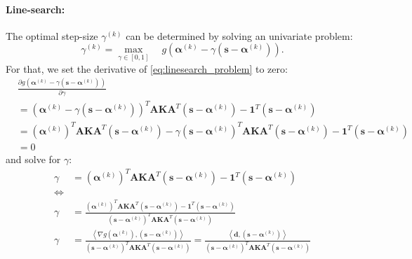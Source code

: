 \documentclass{article}
\newcommand{\balpha}{\boldsymbol{\alpha}}
\newcommand{\bones}{\mathbf{1}}
\begin{document}
\paragraph{Line-search:}
The optimal step-size $\gamma^{(k)}$ can be determined by solving an univariate problem:
\begin{equation}
    \gamma^{(k)}=\underset{\gamma\in[0,1]}{\max}\quad g\left(\balpha^{(k)}-\gamma\left(\mathbf{s}-\balpha^{(k)}\right)\right).
    \label{eq:linesearch_problem}
\end{equation}
For that, we set the derivative of \eqref{eq:linesearch_problem} to zero: 
\begin{align}
    &\frac{\partial g\left(\balpha^{(k)}-\gamma\left(\mathbf{s}-\balpha^{(k)}\right)\right)}{\partial\gamma}\\
        &=\left(\balpha^{(k)}-\gamma\left(\mathbf{s}-\balpha^{(k)}\right)\right)^T\mathbf{A}\mathbf{K}\mathbf{A}^T\left(\mathbf{s}-\balpha^{(k)}\right)-\bones^T\left(\mathbf{s}-\balpha^{(k)}\right)\\
        &=\left(\balpha^{(k)}\right)^T\mathbf{A}\mathbf{K}\mathbf{A}^T\left(\mathbf{s}-\balpha^{(k)}\right)
            -\gamma\left(\mathbf{s}-\balpha^{(k)}\right)^T\mathbf{A}\mathbf{K}\mathbf{A}^T\left(\mathbf{s}-\balpha^{(k)}\right)
            -\bones^T\left(\mathbf{s}-\balpha^{(k)}\right)\\
        &=0
\end{align}
and solve for $\gamma$:
\begin{align}
    \gamma
    &=\left(\balpha^{(k)}\right)^T\mathbf{A}\mathbf{K}\mathbf{A}^T\left(\mathbf{s}-\balpha^{(k)}\right)
            -\bones^T\left(\mathbf{s}-\balpha^{(k)}\right)\\
    \Leftrightarrow\\
    \gamma&=\frac{\left(\balpha^{(k)}\right)^T\mathbf{A}\mathbf{K}\mathbf{A}^T\left(\mathbf{s}-\balpha^{(k)}\right)
            -\bones^T\left(\mathbf{s}-\balpha^{(k)}\right)}{\left(\mathbf{s}-\balpha^{(k)}\right)^T\mathbf{A}\mathbf{K}\mathbf{A}^T\left(\mathbf{s}-\balpha^{(k)}\right)}\\
    \gamma&=\frac{\left\langle\nabla g\left(\balpha^{(k)}\right),\left(\mathbf{s}-\balpha^{(k)}\right)\right\rangle}{\left(\mathbf{s}-\balpha^{(k)}\right)^T\mathbf{A}\mathbf{K}\mathbf{A}^T\left(\mathbf{s}-\balpha^{(k)}\right)}
           =\frac{\left\langle\mathbf{d},\left(\mathbf{s}-\balpha^{(k)}\right)\right\rangle}{\left(\mathbf{s}-\balpha^{(k)}\right)^T\mathbf{A}\mathbf{K}\mathbf{A}^T\left(\mathbf{s}-\balpha^{(k)}\right)}\\
\end{align}
\end{document}
